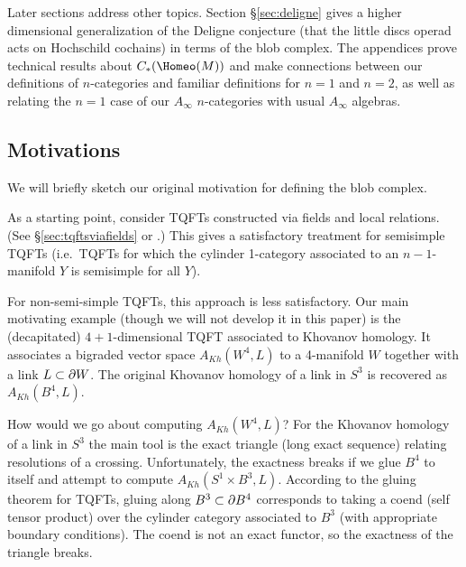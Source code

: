 Later sections address other topics.
Section \S \ref{sec:deligne} gives
a higher dimensional generalization of the Deligne conjecture 
(that the little discs operad acts on Hochschild cochains) in terms of the blob complex.
The appendices prove technical results about $\CH{M}$ and
make connections between our definitions of $n$-categories and familiar definitions for $n=1$ and $n=2$, 
as well as relating the $n=1$ case of our $A_\infty$ $n$-categories with usual $A_\infty$ algebras. 



\subsection{Motivations}
\label{sec:motivations}

We will briefly sketch our original motivation for defining the blob complex.

As a starting point, consider TQFTs constructed via fields and local relations.
(See \S\ref{sec:tqftsviafields} or \cite{kw:tqft}.)
This gives a satisfactory treatment for semisimple TQFTs
(i.e.\ TQFTs for which the cylinder 1-category associated to an
$n{-}1$-manifold $Y$ is semisimple for all $Y$).

For non-semi-simple TQFTs, this approach is less satisfactory.
Our main motivating example (though we will not develop it in this paper)
is the (decapitated) $4{+}1$-dimensional TQFT associated to Khovanov homology.
It associates a bigraded vector space $A_{Kh}(W^4, L)$ to a 4-manifold $W$ together
with a link $L \subset \partial W$.
The original Khovanov homology of a link in $S^3$ is recovered as $A_{Kh}(B^4, L)$.

How would we go about computing $A_{Kh}(W^4, L)$?
For the Khovanov homology of a link in $S^3$ the main tool is the exact triangle (long exact sequence)
relating resolutions of a crossing.
Unfortunately, the exactness breaks if we glue $B^4$ to itself and attempt
to compute $A_{Kh}(S^1\times B^3, L)$.
According to the gluing theorem for TQFTs, gluing along $B^3 \subset \partial B^4$
corresponds to taking a coend (self tensor product) over the cylinder category
associated to $B^3$ (with appropriate boundary conditions).
The coend is not an exact functor, so the exactness of the triangle breaks.

